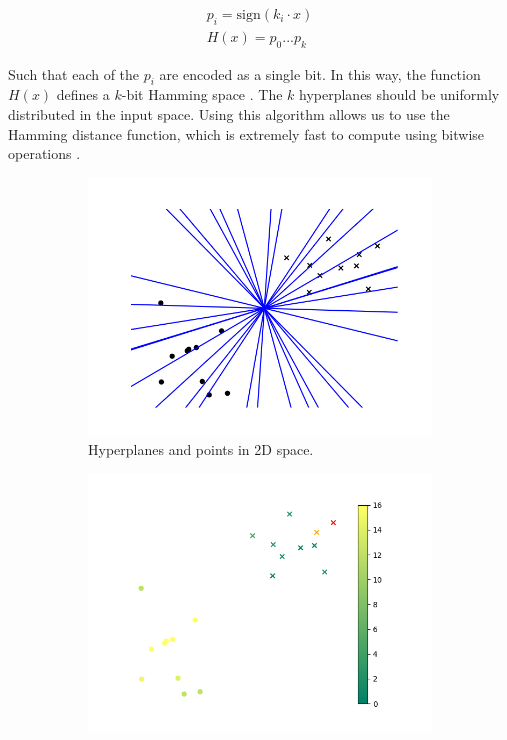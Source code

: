 \begin{align}
    p_i = \text{sign}(k_i \cdot x) \\
    H(x) = p_0...p_k
\end{align}

Such that each of the $p_i$ are encoded as a single bit. In this way, the function $H(x)$ defines a $k$-bit Hamming space \cite{hamming1950error}. The $k$ hyperplanes should be uniformly distributed in the input space. Using this algorithm allows us to use the Hamming distance function, which is extremely fast to compute using bitwise operations \cite{cohen1997covering}.

\begin{figure}[h]
    \centering
    \begin{subfigure}[t]{0.24\textwidth}
            \includegraphics[width=\textwidth]{images/lsh_planes.png}
            \caption{Hyperplanes and points in 2D space.}   
            \label{fig:lshplanes}   
    \end{subfigure} 
    \begin{subfigure}[t]{0.24\textwidth}
            \includegraphics[width=\textwidth]{images/lsh_distance.png}

\end{subfigure}
\end{figure}
